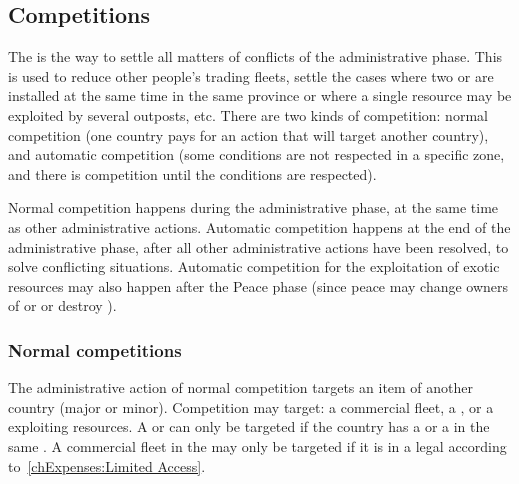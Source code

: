 \subsection{Competitions}\label{chExpenses:Competition}

\aparag The  is the way to settle all matters of
conflicts of the administrative phase. This is used to reduce other people's
trading fleets, settle the cases where two \TP or \COL are installed at the
same time in the same province or where a single resource may be exploited by
several outposts, etc. There are two kinds of competition: normal competition
(one country pays for an action that will target another country), and
automatic competition (some conditions are not respected in a specific zone,
and there is competition until the conditions are respected).

\aparag[Sequence] Normal competition happens during the administrative phase,
at the same time as other administrative actions. Automatic competition
happens at the end of the administrative phase, after all other administrative
actions have been resolved, to solve conflicting situations. Automatic
competition for the exploitation of exotic resources may also happen after the
Peace phase (since peace may change owners of \TP or \COL or destroy \TP).


\subsubsection{Normal competitions}
\aparag[Target] The administrative action of normal competition targets an
item of another country (major or minor).
\bparag Competition may target: a commercial fleet, a \TP, or a \COL
exploiting resources.
\bparag A \TP or \COL can only be targeted if the country has a \TP or a \COL
in the same \Area.
\bparag A commercial fleet in the \ROTW may only be targeted if it is in a
legal \STZ according to~\ref{chExpenses:Limited Access}.

